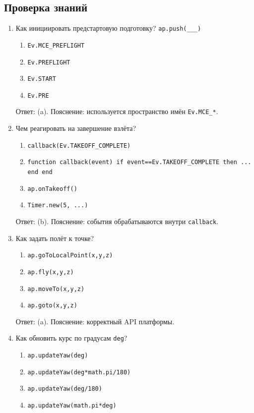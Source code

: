 \subsection{Проверка знаний}
\begin{enumerate}
  \item Как инициировать предстартовую подготовку? \texttt{ap.push(\_\_\_)} 
  \begin{enumerate}[label=(\alph*)] \item \texttt{Ev.MCE\_PREFLIGHT} \item \texttt{Ev.PREFLIGHT} \item \texttt{Ev.START} \item \texttt{Ev.PRE} \end{enumerate}
  Ответ: (a). Пояснение: используется пространство имён \texttt{Ev.MCE\_*}.
  \item Чем реагировать на завершение взлёта? 
  \begin{enumerate}[label=(\alph*)] \item \texttt{callback(Ev.TAKEOFF\_COMPLETE)} \item \texttt{function callback(event) if event==Ev.TAKEOFF\_COMPLETE then ... end end} \item \texttt{ap.onTakeoff()} \item \texttt{Timer.new(5, ...)} \end{enumerate}
  Ответ: (b). Пояснение: события обрабатываются внутри \texttt{callback}.
  \item Как задать полёт к точке? 
  \begin{enumerate}[label=(\alph*)] \item \texttt{ap.goToLocalPoint(x,y,z)} \item \texttt{ap.fly(x,y,z)} \item \texttt{ap.moveTo(x,y,z)} \item \texttt{ap.goto(x,y,z)} \end{enumerate}
  Ответ: (a). Пояснение: корректный API платформы.
  \item Как обновить курс по градусам \texttt{deg}? 
  \begin{enumerate}[label=(\alph*)] \item \texttt{ap.updateYaw(deg)} \item \texttt{ap.updateYaw(deg*math.pi/180)} \item \texttt{ap.updateYaw(deg/180)} \item \texttt{ap.updateYaw(math.pi*deg)} \end{enumerate}

\end{enumerate}
